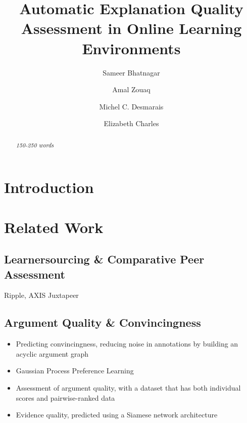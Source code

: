 \documentclass[runningheads]{llncs}
\begin{document}
%
\title{Automatic Explanation Quality Assessment in Online Learning Environments}
%
\author{Sameer Bhatnagar \and
Amal Zouaq \and
Michel C. Desmarais \and
Elizabeth Charles
}
%

%
\maketitle              %
%
\begin{abstract}
\textit{
	150-250 words
}

\end{abstract}


\section{Introduction}

\section{Related Work}

\subsection{Learnersourcing \& Comparative Peer Assessment}
Ripple\cite{khosravi_ripple_2019}, AXIS\cite{williams_axis:_2016}
Juxtapeer\cite{cambre_juxtapeer:_2018}

\subsection{Argument Quality \& Convincingness}
\begin{itemize}
	\item \cite{habernal_which_2016} Predicting convincingness, reducing noise 
	in annotations by building an acyclic 
	argument graph
	\item \cite{simpson_finding_2018} Gaussian Process Preference Learning 
	\item \cite{toledo_automatic_2019} Assessment of argument quality, with a 
	dataset that has both individual scores 
	and pairwise-ranked data 
	\item \cite{gleize_are_2019} Evidence quality, predicted using a Siamese 
	network architecture 
	
\end{itemize}
  
\end{document}
